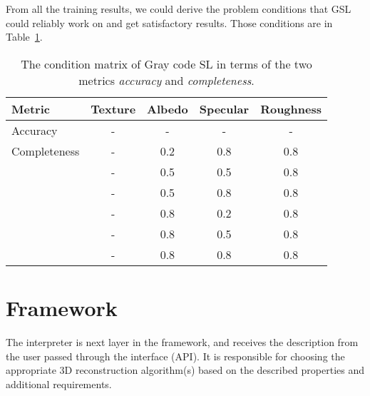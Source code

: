 From all the training results, we could derive the problem conditions that GSL could reliably work on and get satisfactory results. Those conditions are in Table~\ref{tab:sl_traing_result}.
\begin{table}[!htbp]
  \centering
  \begin{tabular}{l*{4}{c}}
  \hline
  \textbf{Metric} & Texture & Albedo & Specular & Roughness\\
  \hline
  Accuracy     & - & - & - & -\\
  \hline
  Completeness & - & 0.2 & 0.8 & 0.8\\
               & - & 0.5 & 0.5 & 0.8\\
               & - & 0.5 & 0.8 & 0.8\\
               & - & 0.8 & 0.2 & 0.8\\
               & - & 0.8 & 0.5 & 0.8\\
               & - & 0.8 & 0.8 & 0.8\\
  \hline
  \end{tabular}
  \caption{The condition matrix of Gray code SL in terms of the two metrics \textit{accuracy} and \textit{completeness}.}
  \label{tab:sl_traing_result}
\end{table}

\section{Framework}
The interpreter is next layer in the framework, and receives the description from the user passed through the interface (\eg API). It is responsible for choosing the appropriate 3D reconstruction algorithm(s) based on the described properties and additional requirements.

